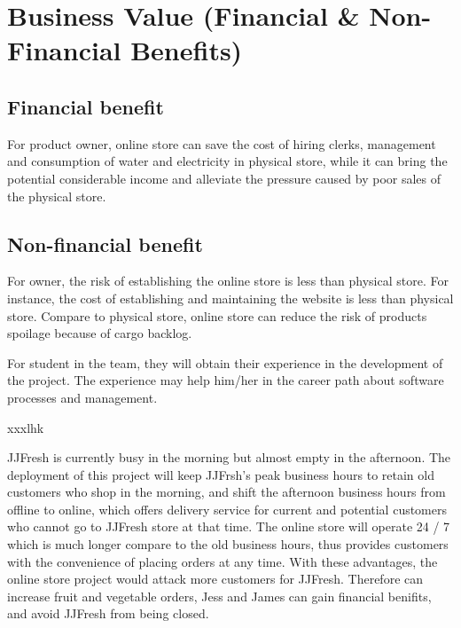 \documentclass{report}
\begin{document}
\section{Business Value (Financial \& Non-Financial Benefits)}
\subsection{Financial benefit}
For product owner, online store can save the cost of hiring clerks, management and consumption of water and electricity in physical store, while it can bring the potential considerable income and alleviate the pressure caused by poor sales of the physical store.

\subsection{Non-financial benefit}
For owner, the risk of establishing the online store is less than physical store. For instance, the cost of establishing and maintaining the website is less than physical store. Compare to physical store, online store can reduce the risk of products spoilage because of cargo backlog.

For student in the team, they will obtain their experience in the development of the project. The experience may help him/her in the career path about software processes and management.

xxxlhk

JJFresh is currently busy in the morning but almost empty in the afternoon. The deployment of this project will keep JJFrsh's peak business hours to retain old customers who shop in the morning, and shift the afternoon business hours from offline to online, which offers delivery service for current and potential customers who cannot go to JJFresh store at that time. The online store will operate 24 / 7 which is much longer compare to the old business hours, thus provides customers with the convenience of placing orders at any time. With these advantages, the online store project would attack more customers for JJFresh. Therefore can increase fruit and vegetable orders, Jess and James can gain financial benifits, and avoid JJFresh from being closed.
\end{document}
